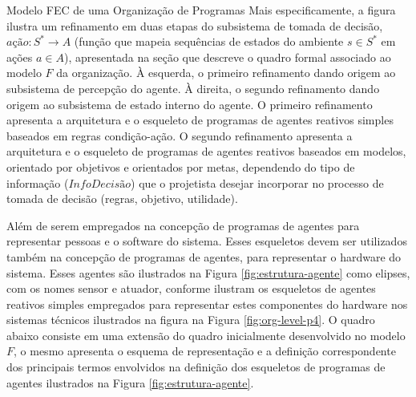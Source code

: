 \begin{section}{Modelo FEC de uma Organização de Programas}
            Mais especificamente, a figura ilustra um refinamento em duas etapas do subsistema de tomada de decisão, $ação: S^*  \rightarrow A$ (função que mapeia sequências de estados do ambiente $s \in S^*$ em ações $a \in A$), apresentada na seção que descreve o quadro formal associado ao modelo $F$ da organização. À esquerda, o primeiro refinamento dando origem ao subsistema de percepção do agente. À direita, o segundo refinamento dando origem ao subsistema de estado interno do agente. O primeiro refinamento apresenta a arquitetura e o esqueleto de programas de agentes reativos simples baseados em regras condição-ação. O segundo refinamento apresenta a arquitetura e o esqueleto de programas de agentes reativos baseados em modelos, orientado por objetivos e orientados por metas, dependendo do tipo de informação ($InfoDecisão$) que o projetista desejar incorporar no processo de tomada de decisão (regras, objetivo, utilidade).
            
            \begin{figure}[h!]
                \centering
            \end{figure}
            
            Além de serem empregados na concepção de programas de agentes para representar pessoas e o software do sistema. Esses esqueletos devem ser utilizados também na concepção de programas de agentes, para representar o hardware do sistema. Esses agentes são ilustrados na Figura \ref{fig:estrutura-agente} como elipses, com os nomes sensor e atuador, conforme ilustram os esqueletos de agentes reativos simples empregados para representar estes componentes do hardware nos sistemas técnicos ilustrados na figura na Figura \ref{fig:org-level-p4}. O quadro abaixo consiste em uma extensão do quadro inicialmente desenvolvido no modelo $F$, o mesmo apresenta o esquema de representação e a definição correspondente dos principais termos envolvidos na definição dos esqueletos de programas de agentes ilustrados na Figura \ref{fig:estrutura-agente}.
            

\end{section}
